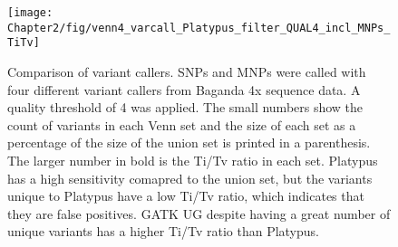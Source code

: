 \begin{figure}
\centering
\texttt{[image: Chapter2/fig/venn4\_varcall\_Platypus\_filter\_QUAL4\_incl\_MNPs\_TiTv]}
\caption{Comparison of variant callers. SNPs and MNPs were called with four different variant callers from Baganda 4x sequence data. A quality threshold of 4 was applied. The small numbers show the count of variants in each Venn set and the size of each set as a percentage of the size of the union set is printed in a parenthesis. The larger number in bold is the Ti/Tv ratio in each set. Platypus has a high sensitivity comapred to the union set, but the variants unique to Platypus have a low Ti/Tv ratio, which indicates that they are false positives. \gls{GATK} \gls{UG} despite having a great number of unique variants has a higher Ti/Tv ratio than Platypus.}
\label{fig:imp_accu_improv}
\end{figure}